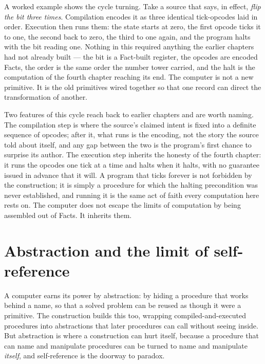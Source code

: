 A worked example shows the cycle turning. Take a source that says, in effect, \emph{flip the bit
three times}. Compilation encodes it as three identical tick-opcodes laid in order. Execution then runs
them: the state starts at zero, the first opcode ticks it to one, the second back to zero, the third to
one again, and the program halts with the bit reading one. Nothing in this required anything the
earlier chapters had not already built --- the bit is a Fact-built register, the opcodes are encoded
Facts, the order is the same order the number tower carried, and the halt is the computation of the
fourth chapter reaching its end. The computer is not a new primitive. It is the old primitives wired
together so that one record can direct the transformation of another.

Two features of this cycle reach back to earlier chapters and are worth naming. The compilation step is
where the source's claimed intent is fixed into a definite sequence of opcodes; after it, what runs is
the encoding, not the story the source told about itself, and any gap between the two is the program's
first chance to surprise its author. The execution step inherits the honesty of the fourth chapter: it
runs the opcodes one tick at a time and halts when it halts, with no guarantee issued in advance that it
will. A program that ticks forever is not forbidden by the construction; it is simply a procedure for
which the halting precondition was never established, and running it is the same act of faith every
computation here rests on. The computer does not escape the limits of computation by being assembled
out of Facts. It inherits them.

\section{Abstraction and the limit of self-reference}
\label{se:abstraction-and-self-reference}

A computer earns its power by abstraction: by hiding a procedure that works behind a name, so that a
solved problem can be reused as though it were a primitive. The construction builds this too, wrapping
compiled-and-executed procedures into abstractions that later procedures can call without seeing
inside. But abstraction is where a construction can hurt itself, because a procedure that can name and
manipulate procedures can be turned to name and manipulate \emph{itself}, and self-reference is the
doorway to paradox.

